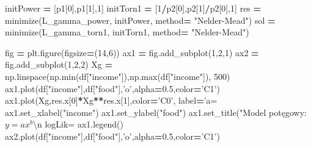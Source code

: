 \documentclass[polish,]{book}
\newenvironment{Shaded}{\begin{snugshade}}{\end{snugshade}}
\newcommand{\BuiltInTok}[1]{#1}
\newcommand{\CharTok}[1]{\textcolor[rgb]{0.31,0.60,0.02}{#1}}
\newcommand{\DecValTok}[1]{\textcolor[rgb]{0.00,0.00,0.81}{#1}}
\newcommand{\FloatTok}[1]{\textcolor[rgb]{0.00,0.00,0.81}{#1}}
\newcommand{\NormalTok}[1]{#1}
\newcommand{\OperatorTok}[1]{\textcolor[rgb]{0.81,0.36,0.00}{\textbf{#1}}}
\newcommand{\SpecialCharTok}[1]{\textcolor[rgb]{0.00,0.00,0.00}{#1}}
\newcommand{\StringTok}[1]{\textcolor[rgb]{0.31,0.60,0.02}{#1}}
\begin{document}
\begin{Shaded}
\begin{Highlighting}[]
\NormalTok{initPower }\OperatorTok{=}\NormalTok{ [p1[}\DecValTok{0}\NormalTok{],p1[}\DecValTok{1}\NormalTok{],}\DecValTok{1}\NormalTok{]}
\NormalTok{initTorn1 }\OperatorTok{=}\NormalTok{ [}\DecValTok{1}\OperatorTok{/}\NormalTok{p2[}\DecValTok{0}\NormalTok{],p2[}\DecValTok{1}\NormalTok{]}\OperatorTok{/}\NormalTok{p2[}\DecValTok{0}\NormalTok{],}\DecValTok{1}\NormalTok{]}
\NormalTok{res }\OperatorTok{=}\NormalTok{ minimize(L_gamma_power, initPower, method}\OperatorTok{=} \StringTok{"Nelder-Mead"}\NormalTok{)}
\NormalTok{sol }\OperatorTok{=}\NormalTok{ minimize(L_gamma_torn1, initTorn1, method}\OperatorTok{=} \StringTok{"Nelder-Mead"}\NormalTok{)}

\NormalTok{fig }\OperatorTok{=}\NormalTok{ plt.figure(figsize}\OperatorTok{=}\NormalTok{(}\DecValTok{14}\NormalTok{,}\DecValTok{6}\NormalTok{))}
\NormalTok{ax1 }\OperatorTok{=}\NormalTok{ fig.add_subplot(}\DecValTok{1}\NormalTok{,}\DecValTok{2}\NormalTok{,}\DecValTok{1}\NormalTok{)}
\NormalTok{ax2 }\OperatorTok{=}\NormalTok{ fig.add_subplot(}\DecValTok{1}\NormalTok{,}\DecValTok{2}\NormalTok{,}\DecValTok{2}\NormalTok{)}
\NormalTok{Xg }\OperatorTok{=}\NormalTok{ np.linspace(np.}\BuiltInTok{min}\NormalTok{(df[}\StringTok{"income"}\NormalTok{]),np.}\BuiltInTok{max}\NormalTok{(df[}\StringTok{"income"}\NormalTok{]), }\DecValTok{500}\NormalTok{)}
\NormalTok{ax1.plot(df[}\StringTok{"income"}\NormalTok{],df[}\StringTok{"food"}\NormalTok{],}\StringTok{'o'}\NormalTok{,alpha}\OperatorTok{=}\FloatTok{0.5}\NormalTok{,color}\OperatorTok{=}\StringTok{'C1'}\NormalTok{)}
\NormalTok{ax1.plot(Xg,res.x[}\DecValTok{0}\NormalTok{]}\OperatorTok{*}\NormalTok{Xg}\OperatorTok{**}\NormalTok{res.x[}\DecValTok{1}\NormalTok{],color}\OperatorTok{=}\StringTok{'C0'}\NormalTok{,}
\NormalTok{         label}\OperatorTok{=}\StringTok{'a= }\SpecialCharTok{%
\NormalTok{ax1.set_xlabel(}\StringTok{"income"}\NormalTok{)}
\NormalTok{ax1.set_ylabel(}\StringTok{"food"}\NormalTok{)}
\NormalTok{ax1.set_title(}\StringTok{"Model potęgowy: $y=ax^b$}\CharTok{\textbackslash{}n}\StringTok{ logLik= }\SpecialCharTok{%
\NormalTok{ax1.legend()}
\NormalTok{ax2.plot(df[}\StringTok{"income"}\NormalTok{],df[}\StringTok{"food"}\NormalTok{],}\StringTok{'o'}\NormalTok{,alpha}\OperatorTok{=}\FloatTok{0.5}\NormalTok{,color}\OperatorTok{=}\StringTok{'C1'}\NormalTok{)}
}}
\end{Highlighting}
\end{Shaded}
\end{document}

